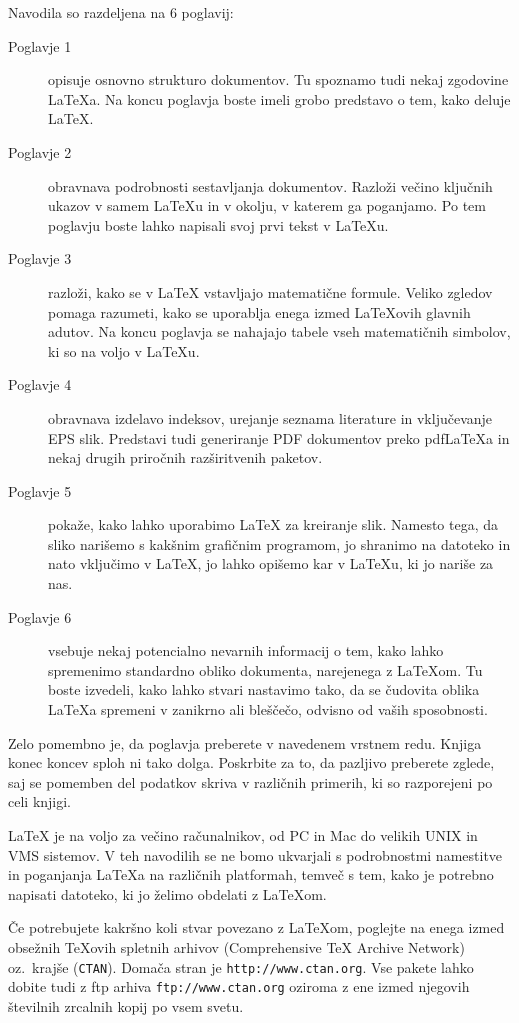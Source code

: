 \bigskip
\noindent Navodila so razdeljena na 6 poglavij:
\begin{description}
\item[Poglavje 1] opisuje osnovno strukturo \LaTeXe{}
  dokumentov. Tu spoznamo tudi nekaj zgodovine \LaTeX{}a.
  Na koncu poglavja boste imeli grobo predstavo o tem, kako 
  deluje \LaTeX{}.
\item[Poglavje 2] obravnava podrobnosti sestavljanja dokumentov. 
  Razloži večino ključnih ukazov v samem \LaTeX{}u in v okolju, v katerem ga
  poganjamo.
  Po tem poglavju boste lahko napisali svoj prvi tekst v \LaTeX{}u. 
\item[Poglavje 3] razloži, kako se v \LaTeX{} vstavljajo matematične 
  formule. Veliko zgledov pomaga razumeti, 
  kako se uporablja enega izmed \LaTeX{}ovih glavnih 
  adutov. Na koncu poglavja se nahajajo tabele vseh matematičnih 
  simbolov, ki so na voljo v \LaTeX{}u. 
\item[Poglavje 4] obravnava izdelavo indeksov, urejanje seznama literature
  in vključevanje EPS slik. Predstavi tudi generiranje PDF dokumentov preko
  pdf\LaTeX{}a in nekaj drugih priročnih razširitvenih paketov.
\item[Poglavje 5] pokaže, kako lahko uporabimo \LaTeX{} za kreiranje slik.
Namesto tega, da sliko narišemo s kakšnim grafičnim programom, jo shranimo
na datoteko in nato vključimo v \LaTeX{}, jo lahko opišemo kar v \LaTeX{}u,
ki jo nariše za nas.
\item[Poglavje 6] vsebuje nekaj potencialno nevarnih informacij o tem, kako lahko spremenimo
  standardno obliko dokumenta, narejenega z \LaTeX{}om. Tu boste izvedeli, 
  kako lahko stvari nastavimo tako, da se čudovita oblika \LaTeX{}a 
  spremeni v zanikrno ali bleščečo, odvisno od vaših sposobnosti.
\end{description}
\bigskip
\noindent 
Zelo pomembno je, da poglavja preberete v navedenem vrstnem redu.
Knjiga konec koncev sploh ni tako dolga. Poskrbite za to, da pazljivo 
preberete zglede,
saj se pomemben del podatkov skriva v različnih primerih, 
ki so razporejeni po celi knjigi.

\bigskip
\noindent 
\LaTeX{} je na voljo za večino računalnikov, od PC in Mac do velikih UNIX 
in VMS sistemov. V teh navodilih se ne bomo ukvarjali s podrobnostmi
namestitve in poganjanja \LaTeX{}a na različnih 
platformah, temveč s tem, kako je potrebno napisati datoteko, 
ki jo želimo obdelati z \LaTeX{}om.

\bigskip
\noindent Če potrebujete kakršno koli stvar povezano z \LaTeX{}om, 
poglejte na enega izmed obsežnih \TeX{}ovih spletnih arhivov 
(Comprehensive \TeX{} Archive Network)
oz.~krajše (\texttt{CTAN}). Domača stran je 
\texttt{http://www.ctan.org}. Vse pakete lahko dobite tudi z 
ftp arhiva \texttt{ftp://www.ctan.org} oziroma z ene izmed njegovih 
številnih zrcalnih 
kopij po vsem svetu. 

